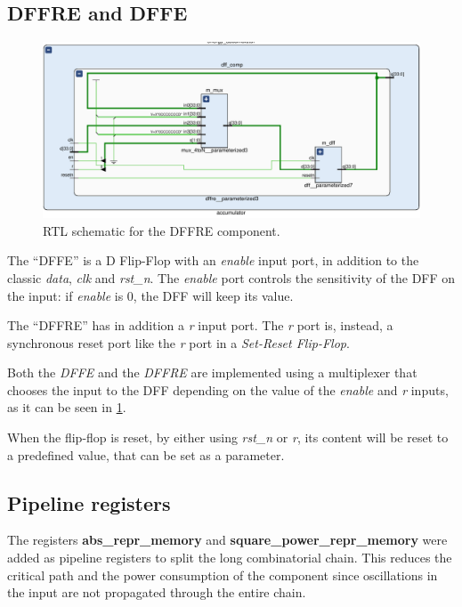 \subsection{DFFRE and DFFE}
\begin{figure}[]
  \centering
  \includegraphics[width=\textwidth]{figs/dffre_schematic.pdf}
  \caption{RTL schematic for the DFFRE component.}
  \label{fig:dffre}
\end{figure}

The ``DFFE'' is a D Flip-Flop with an \emph{enable} input port,
in addition to the classic \emph{data}, \emph{clk} and \emph{rst\_n}.
The \emph{enable} port controls the sensitivity of the DFF on the input: if
\emph{enable} is 0, the DFF will keep its value.

The ``DFFRE'' has in addition a \emph{r} input port. The \emph{r} port is, instead,
a synchronous reset port like the \emph{r} port in a \emph{Set-Reset Flip-Flop}.

Both the \emph{DFFE} and the \emph{DFFRE} are implemented using a multiplexer that
chooses the input to the DFF depending on the value of the \emph{enable} and
\emph{r} inputs, as it can be seen in \cref{fig:dffre}.

When the flip-flop is reset, by either using \emph{rst\_n} or \emph{r}, its
content will be reset to a predefined value, that can be set as a parameter.

\subsection{Pipeline registers}
\label{sec:pipeline}

The registers \textbf{abs\_repr\_memory} and \textbf{square\_power\_repr\_memory}
were added as pipeline registers to split the long combinatorial chain. This 
reduces the critical path and the power consumption of the component since 
oscillations in the input are not propagated through the entire chain.